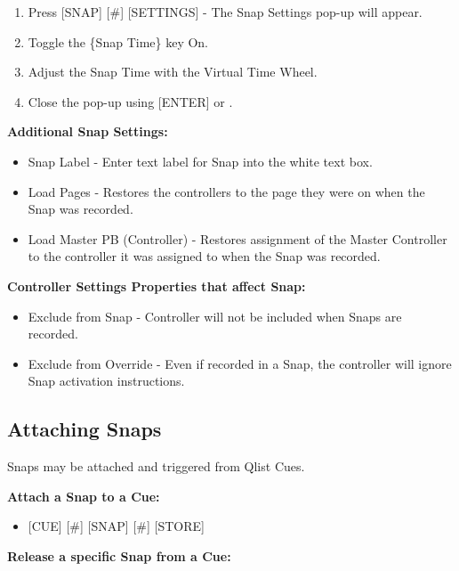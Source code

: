 \documentclass[
]{article}
\providecommand{\tightlist}{%
  \setlength{\itemsep}{0pt}\setlength{\parskip}{0pt}}
\begin{document}
\begin{enumerate}
\def\labelenumi{\arabic{enumi}.}
\item
  Press {[}SNAP{]} {[}\#{]} {[}SETTINGS{]} - The Snap Settings pop-up will appear.
\item
  Toggle the \{Snap Time\} key On.
\item
  Adjust the Snap Time with the Virtual Time Wheel.
\item
  Close the pop-up using {[}ENTER{]} or \href{image.png}{} .
\end{enumerate}

\textbf{Additional Snap Settings:}

\begin{itemize}
\item
  Snap Label - Enter text label for Snap into the white text box.
\item
  Load Pages - Restores the controllers to the page they were on when the Snap was recorded.
\item
  Load Master PB (Controller) - Restores assignment of the Master Controller to the controller it was assigned to when the Snap was recorded.
\end{itemize}

\textbf{Controller Settings Properties that affect Snap:}

\begin{itemize}
\item
  Exclude from Snap - Controller will not be included when Snaps are recorded.
\item
  Exclude from Override - Even if recorded in a Snap, the controller will ignore Snap activation instructions.
\end{itemize}

\hypertarget{attaching-snaps}{%
\subsection{Attaching Snaps}\label{attaching-snaps}}

Snaps may be attached and triggered from Qlist Cues.

\textbf{Attach a Snap to a Cue:}

\begin{itemize}
\tightlist
\item
  {[}CUE{]} {[}\#{]} {[}SNAP{]} {[}\#{]} {[}STORE{]}
\end{itemize}

\textbf{Release a specific Snap from a Cue:}
\end{document}

